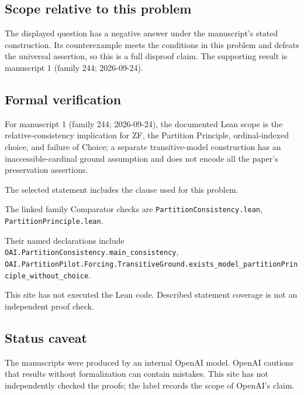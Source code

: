 \documentclass[11pt]{article}
\begin{document}
\subsection{Scope relative to this problem}
The displayed question has a negative answer under the manuscript's stated construction. Its counterexample meets the conditions in this problem and defeats the universal assertion, so this is a full disproof claim. The supporting result is manuscript 1 (family 244; 2026-09-24).

\subsection{Formal verification}
For manuscript 1 (family 244; 2026-09-24), the documented Lean scope is the relative-consistency implication for ZF, the Partition Principle, ordinal-indexed choice, and failure of Choice; a separate transitive-model construction has an inaccessible-cardinal ground assumption and does not encode all the paper's preservation assertions.

The selected statement includes the clause used for this problem.

The linked family Comparator checks are \texttt{PartitionConsistency.lean}, \texttt{PartitionPrinciple.lean}.

Their named declarations include \texttt{OAI.PartitionConsistency.main\_consistency}, \texttt{OAI.PartitionPilot.Forcing.TransitiveGround.exists\_model\_partitionPrinciple\_without\_choice}.

This site has not executed the Lean code. Described statement coverage is not an independent proof check.

\subsection{Status caveat}
The manuscripts were produced by an internal OpenAI model. OpenAI cautions that results without formalization can contain mistakes. This site has not independently checked the proofs; the label records the scope of OpenAI's claim.
\end{document}
